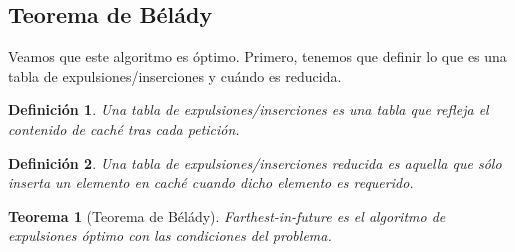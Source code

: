 \documentclass[a4paper, 11pt]{article} %
\newtheorem*{mydef}{Definición}
\newtheorem{theorem}{Teorema}
\begin{document}
  \subsection{Teorema de Bélády}
  Veamos que este algoritmo es óptimo.
  Primero, tenemos que definir lo que es una tabla de expulsiones/inserciones y cuándo es reducida.


  \begin{mydef}
    Una tabla de expulsiones/inserciones es una tabla que refleja el contenido de caché tras cada petición.
  \end{mydef}
  
  \begin{mydef}
    Una tabla de expulsiones/inserciones reducida es aquella que sólo inserta un elemento en caché cuando dicho elemento es requerido.
  \end{mydef}
  
  \begin{theorem}[Teorema de Bélády]
    Farthest-in-future es el algoritmo de expulsiones óptimo con las condiciones del problema.
  \end{theorem}
\end{document}
